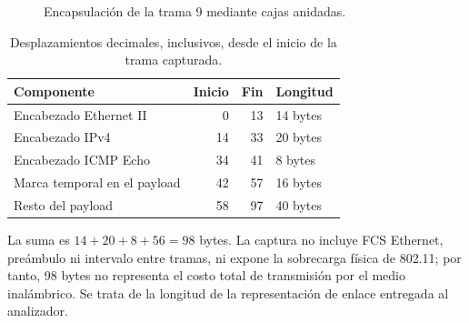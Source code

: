 \documentclass[12pt,a4paper]{article}
\begin{document}
\begin{figure}[H]
\centering
{}
\caption{Encapsulación de la trama 9 mediante cajas anidadas.}
\label{fig:icmp-cajas}
\end{figure}

\begin{table}[H]
\centering\small
\begin{tabular}{@{}lrrl@{}}
\toprule
\textbf{Componente} & \textbf{Inicio} & \textbf{Fin} & \textbf{Longitud} \\
\midrule
Encabezado Ethernet II & 0 & 13 & 14 bytes \\
Encabezado IPv4 & 14 & 33 & 20 bytes \\
Encabezado ICMP Echo & 34 & 41 & 8 bytes \\
Marca temporal en el payload & 42 & 57 & 16 bytes \\
Resto del payload & 58 & 97 & 40 bytes \\
\bottomrule
\end{tabular}
\caption{Desplazamientos decimales, inclusivos, desde el inicio de la trama capturada.}
\label{tab:icmp-bytes}
\end{table}

La suma es $14+20+8+56=98$ bytes. La captura no incluye FCS Ethernet,
preámbulo ni intervalo entre tramas, ni expone la sobrecarga física de
802.11; por tanto, 98 bytes no representa el costo total de transmisión por
el medio inalámbrico. Se trata de la longitud de la representación de enlace
entregada al analizador.
\end{document}
